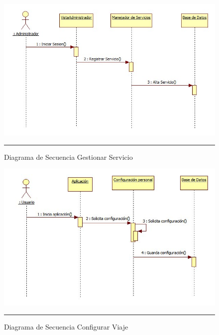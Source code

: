 \begin{figure}[H]
	\centering
		\includegraphics[width=1\textwidth]{Figuras/servicio.jpg}
		\rule{30em}{0.5pt}
	\caption[Diagrama de Secuencia Gestionar Servicio]{Diagrama de Secuencia Gestionar Servicio}
	\label{fig:secGestionarLugar}
\end{figure}

\begin{figure}[H]
	\centering
		\includegraphics[width=1\textwidth]{Figuras/secConfigurarViaje.png}
		\rule{30em}{0.5pt}
	\caption[Diagrama de Secuencia Configurar Viaje]{Diagrama de Secuencia Configurar Viaje}
	\label{fig:secConfigurarViaje}
\end{figure}

